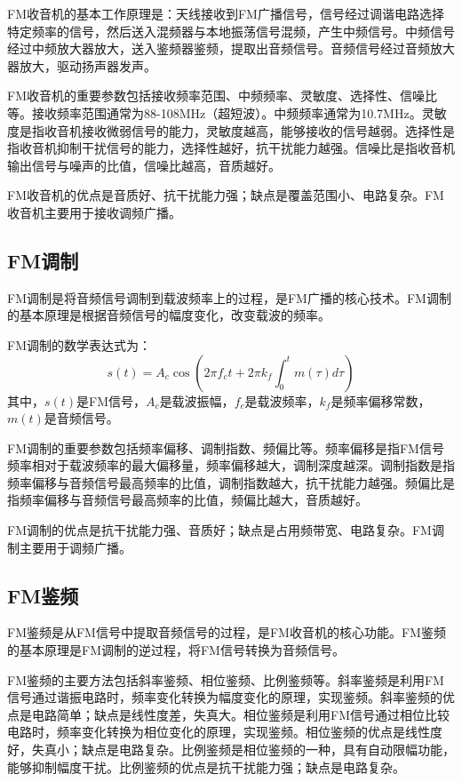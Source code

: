 \documentclass[12pt,UTF8]{ctexbook}
\begin{document}
FM收音机的基本工作原理是：天线接收到FM广播信号，信号经过调谐电路选择特定频率的信号，然后送入混频器与本地振荡信号混频，产生中频信号。中频信号经过中频放大器放大，送入鉴频器鉴频，提取出音频信号。音频信号经过音频放大器放大，驱动扬声器发声。

FM收音机的重要参数包括接收频率范围、中频频率、灵敏度、选择性、信噪比等。接收频率范围通常为88-108MHz（超短波）。中频频率通常为10.7MHz。灵敏度是指收音机接收微弱信号的能力，灵敏度越高，能够接收的信号越弱。选择性是指收音机抑制干扰信号的能力，选择性越好，抗干扰能力越强。信噪比是指收音机输出信号与噪声的比值，信噪比越高，音质越好。

FM收音机的优点是音质好、抗干扰能力强；缺点是覆盖范围小、电路复杂。FM收音机主要用于接收调频广播。

\subsection{FM调制}

FM调制是将音频信号调制到载波频率上的过程，是FM广播的核心技术。FM调制的基本原理是根据音频信号的幅度变化，改变载波的频率。

FM调制的数学表达式为：
\[ s(t) = A_c\cos\left(2\pi f_c t + 2\pi k_f \int_0^t m(\tau)d\tau\right) \]
其中，$s(t)$是FM信号，$A_c$是载波振幅，$f_c$是载波频率，$k_f$是频率偏移常数，$m(t)$是音频信号。

FM调制的重要参数包括频率偏移、调制指数、频偏比等。频率偏移是指FM信号频率相对于载波频率的最大偏移量，频率偏移越大，调制深度越深。调制指数是指频率偏移与音频信号最高频率的比值，调制指数越大，抗干扰能力越强。频偏比是指频率偏移与音频信号最高频率的比值，频偏比越大，音质越好。

FM调制的优点是抗干扰能力强、音质好；缺点是占用频带宽、电路复杂。FM调制主要用于调频广播。

\subsection{FM鉴频}

FM鉴频是从FM信号中提取音频信号的过程，是FM收音机的核心功能。FM鉴频的基本原理是FM调制的逆过程，将FM信号转换为音频信号。

FM鉴频的主要方法包括斜率鉴频、相位鉴频、比例鉴频等。斜率鉴频是利用FM信号通过谐振电路时，频率变化转换为幅度变化的原理，实现鉴频。斜率鉴频的优点是电路简单；缺点是线性度差，失真大。相位鉴频是利用FM信号通过相位比较电路时，频率变化转换为相位变化的原理，实现鉴频。相位鉴频的优点是线性度好，失真小；缺点是电路复杂。比例鉴频是相位鉴频的一种，具有自动限幅功能，能够抑制幅度干扰。比例鉴频的优点是抗干扰能力强；缺点是电路复杂。
\end{document}

